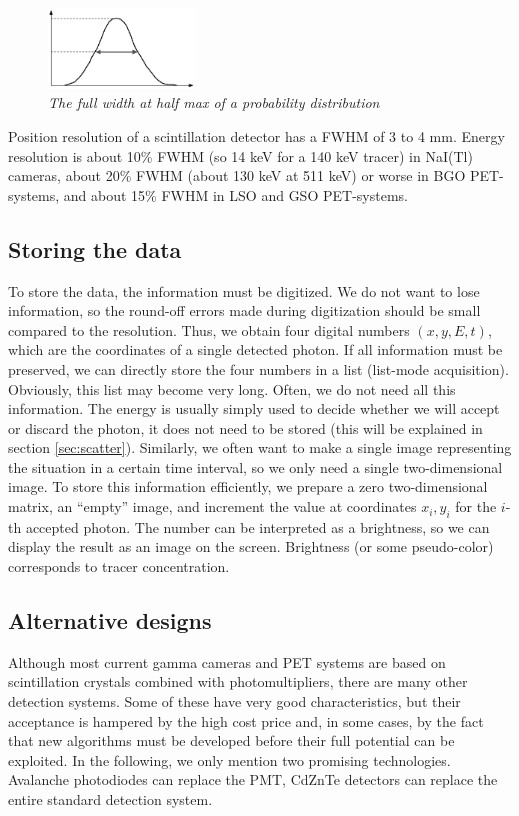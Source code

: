 \documentclass[11pt,oneside]{book}
\begin{document}
\begin{figure}[tb]
\centering
\includegraphics[width=0.35\textwidth]{figs/fig_fwhm.pdf}
\caption{\label{fig:fwhm} \emph{The full width at half max of a probability
distribution}}
\end{figure}

Position resolution of a scintillation detector has a FWHM of 3 to 4 mm.
Energy resolution is about 10\% FWHM (so 14 keV for a 140 keV tracer) in
NaI(Tl) cameras, about 20\% FWHM (about 130 keV at 511 keV) or worse in
BGO PET-systems, and about 15\% FWHM in LSO and GSO PET-systems.

\subsection{Storing the data} \label{sec:storing_data}
To store the data, the information must be digitized. We do not want to lose
information, so the round-off errors made during digitization should be small
compared to the resolution. Thus, we obtain four digital numbers $(x, y, E,
t)$, which are the coordinates of a single detected photon. If all information
must be preserved, we can directly store the four numbers in a list (list-mode
acquisition). Obviously, this list may become very long. Often, we do not need
all this information. The energy is usually simply used to decide whether we
will accept or discard the photon, it does not need to be stored (this will be
explained in section \ref{sec:scatter}). Similarly, we often want to
make a single image representing the situation in a certain time interval, so
we only need a single two-dimensional image. To store this information
efficiently, we prepare a zero two-dimensional matrix, an ``empty'' image, and
increment the value at coordinates $x_i, y_i$ for the $i$-th accepted
photon. The number can be interpreted as a brightness, so we can display the
result as an image on the screen. Brightness (or some pseudo-color)
corresponds to tracer concentration.


\subsection{Alternative designs}
Although most current gamma cameras and PET systems are based on
scintillation crystals combined with photomultipliers, there are many
other detection systems. Some of these have very good characteristics, but
their acceptance is hampered by the high cost price and, in some cases, by
the fact that new algorithms must be developed before their full potential
can be exploited. In the following, we only mention two promising
technologies. Avalanche photodiodes can replace the PMT, CdZnTe detectors
can replace the entire standard detection system.
\end{document}
